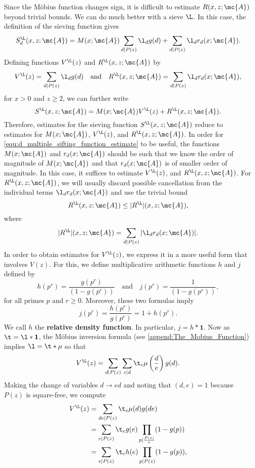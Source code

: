     Since the M\"obius function changes sign, it is difficult to estimate $R(x,z;\mc{A})$ beyond trivial bounds. We can do much better with a sieve $\L$. In this case, the definition of the sieving function gives
    \[
      S_{d}^{\L}(x,z;\mc{A}) = M(x;\mc{A})\sum_{d \mid P(z)}\l_{d}g(d)+\sum_{d \mid P(z)}\l_{d}r_{d}(x;\mc{A}).
    \]
    Defining functions $V^{\L}(z)$ and $R^{\L}(x,z;\mc{A})$ by
     \[
      V^{\L}(z) = \sum_{d \mid P(z)}\l_{d}g(d) \quad \text{and} \quad R^{\L}(x,z;\mc{A}) = \sum_{d \mid P(z)}\l_{d}r_{d}(x;\mc{A}),
    \]
    for $x > 0$ and $z \ge 2$, we can further write
    \begin{equation}\label{equ:estimate_for_sieving_function}
      S^{\L}(x,z;\mc{A}) = M(x;\mc{A})V^{\L}(z)+R^{\L}(x,z;\mc{A}).
    \end{equation}
    Therefore, estimates for the sieving function $S^{\L}(x,z;\mc{A})$ reduce to estimates for $M(x;\mc{A})$, $V^{\L}(z)$, and $R^{\L}(x,z;\mc{A})$. In order for \cref{equ:d_multiple_sifting_function_estimate} to be useful, the functions $M(x;\mc{A})$ and $r_{d}(x;\mc{A})$ should be such that we know the order of magnitude of $M(x;\mc{A})$ and that $r_{d}(x;\mc{A})$ is of smaller order of magnitude. In this case, it suffices to estimate $V^{\L}(z)$, and $R^{\L}(x,z;\mc{A})$. For $R^{\L}(x,z;\mc{A})$, we will usually discard possible cancellation from the individual terms $\l_{d}r_{d}(x;\mc{A})$ and use the trivial bound
    \[
      R^{\L}(x,z;\mc{A}) \le |R^{\L}|(x,z;\mc{A}),
    \]
    where
    \[
      |R^{\L}|(x,z;\mc{A}) = \sum_{d \mid P(z)}|\l_{d}r_{d}(x;\mc{A})|.
    \]
    In order to obtain estimates for $V^{\L}(z)$, we express it in a more useful form that involves $V(z)$. For this, we define multiplicative arithmetic functions $h$ and $j$ defined by
    \[
      h(p^{r}) = \frac{g(p^{r})}{(1-g(p^{r}))} \quad \text{and} \quad j(p^{r}) = \frac{1}{(1-g(p^{r}))},
    \]
    for all primes $p$ and $r \ge 0$. Moreover, these two formulas imply
    \[
      j(p^{r}) = \frac{h(p^{r})}{g(p^{r})} = 1+h(p^{r}).
    \]
    We call $h$ the \textbf{relative density function}. In particular, $j = h \ast \mathbf{1}$. Now as $\t = \l \ast \mathbf{1}$, the M\"obius inversion formula (see \cref{append:The_Mobius_Function}) implies $\l = \t \ast \mu$ so that
    \[
      V^{\L}(z) = \sum_{d \mid P(z)}\sum_{e \mid d}\t_{e}\mu\left(\frac{d}{e}\right)g(d).
    \]
    Making the change of variables $d \to ed$ and noting that $(d,e) = 1$ because $P(z)$ is square-free, we compute
    \begin{align*}
      V^{\L}(z) &= \sum_{de \mid P(z)}\t_{e}\mu(d)g(de) \\
      &= \sum_{e \mid P(z)}\t_{e}g(e)\prod_{p \mid \frac{P(z)}{e}}(1-g(p)) \\
      &= \sum_{e \mid P(z)}\t_{e}h(e)\prod_{p \mid P(z)}(1-g(p)),
    \end{align*}

